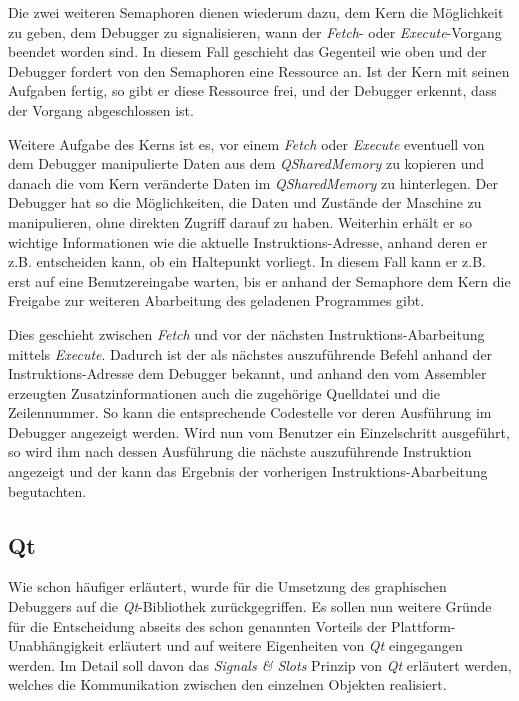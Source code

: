 Die zwei weiteren Semaphoren dienen wiederum dazu, dem Kern die Möglichkeit zu geben, dem Debugger zu signalisieren, wann der \emph{Fetch}- oder \emph{Execute}-Vorgang beendet worden sind. In diesem Fall geschieht das Gegenteil wie oben und der Debugger fordert von den Semaphoren eine Ressource an. Ist der Kern mit seinen Aufgaben fertig, so gibt er diese Ressource frei, und der Debugger erkennt, dass der Vorgang abgeschlossen ist.

Weitere Aufgabe des Kerns ist es, vor einem \emph{Fetch} oder \emph{Execute} eventuell von dem Debugger manipulierte Daten aus dem \emph{QSharedMemory} zu kopieren und danach die vom Kern veränderte Daten im \emph{QSharedMemory} zu hinterlegen. Der Debugger hat so die Möglichkeiten, die Daten und Zustände der Maschine zu manipulieren, ohne direkten Zugriff darauf zu haben. Weiterhin erhält er so wichtige Informationen wie die aktuelle Instruktions-Adresse, anhand deren er z.B. entscheiden kann, ob ein Haltepunkt vorliegt. In diesem Fall kann er z.B. erst auf eine Benutzereingabe warten, bis er anhand der Semaphore dem Kern die Freigabe zur weiteren Abarbeitung des geladenen Programmes gibt.

Dies geschieht zwischen \emph{Fetch} und vor der nächsten Instruktions-Abarbeitung mittels \emph{Execute}. Dadurch ist der als nächstes auszuführende Befehl anhand der Instruktions-Adresse dem Debugger bekannt, und anhand den vom Assembler erzeugten Zusatzinformationen auch die zugehörige Quelldatei und die Zeilennummer. So kann die entsprechende Codestelle vor deren Ausführung im Debugger angezeigt werden. Wird nun vom Benutzer ein Einzelschritt ausgeführt, so wird ihm nach dessen Ausführung die nächste auszuführende Instruktion angezeigt und der kann das Ergebnis der vorherigen Instruktions-Abarbeitung begutachten.  

\subsection{Qt}

Wie schon häufiger erläutert, wurde für die Umsetzung des graphischen Debuggers auf die \emph{Qt}-Bibliothek zurückgegriffen. Es sollen nun weitere Gründe für die Entscheidung abseits des schon genannten Vorteils der Plattform-Unabhängigkeit erläutert und auf weitere Eigenheiten von \emph{Qt} eingegangen werden. Im Detail soll davon das \emph{Signals \& Slots} Prinzip von \emph{Qt} erläutert werden, welches die Kommunikation zwischen den einzelnen Objekten realisiert.

